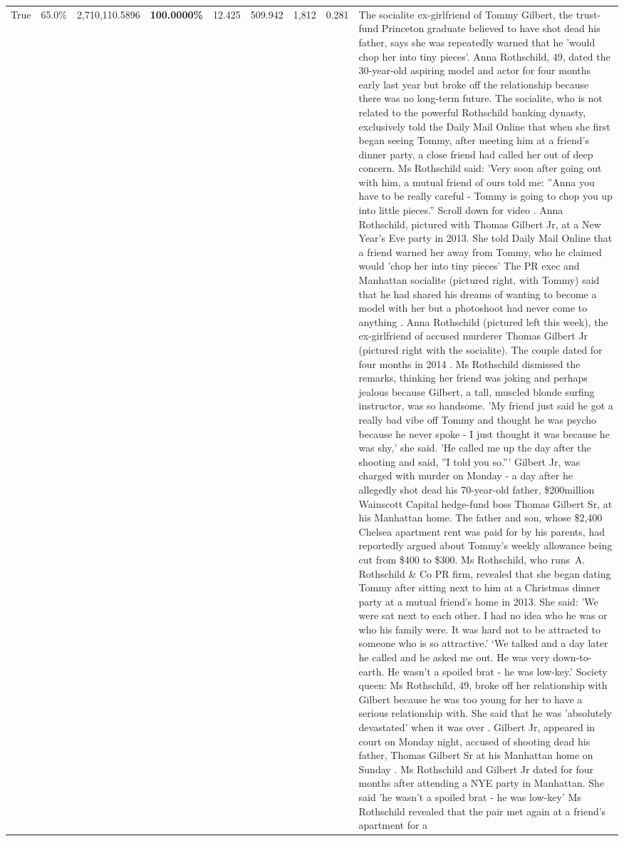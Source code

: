 \begin{table}[H]
\begin{tabular}{lllrlllll}
True & 65.0\% & 2,710,110.5896 & \bfseries \color{red} 100.0000\% & 12.425 & 509.942 & 1,812 & 0.281 & The socialite ex-girlfriend of Tommy Gilbert, the trust-fund Princeton graduate believed to have shot dead his father, says she was repeatedly warned that he 'would chop her into tiny pieces'. Anna Rothschild, 49, dated the 30-year-old aspiring model and actor for four months early last year but broke off the relationship because there was no long-term future. The socialite, who is not related to the powerful Rothschild banking dynasty, exclusively told the Daily Mail Online that when she first began seeing Tommy, after meeting him at a friend's dinner party, a close friend had called her out of deep concern. Ms Rothschild said: 'Very soon after going out with him, a mutual friend of ours told me: ''Anna you have to be really careful - Tommy is going to chop you up into little pieces.'' Scroll down for video . Anna Rothschild, pictured with Thomas Gilbert Jr, at a New Year's Eve party in 2013. She told Daily Mail Online that a friend warned her away from Tommy, who he claimed would 'chop her into tiny pieces' The PR exec and Manhattan socialite (pictured right, with Tommy) said that he had shared his dreams of wanting to become a model with her but a photoshoot had never come to anything . Anna Rothschild (pictured left this week), the ex-girlfriend of accused murderer Thomas Gilbert Jr (pictured right with the socialite). The couple dated for four months in 2014 . Ms Rothschild dismissed the remarks, thinking her friend was joking and perhaps jealous because Gilbert, a tall, muscled blonde surfing instructor, was so handsome. 'My friend just said he got a really bad vibe off Tommy and thought he was psycho because he never spoke - I just thought it was because he was shy,' she said. 'He called me up the day after the shooting and said, ''I told you so.''' Gilbert Jr, was charged with murder on Monday - a day after he allegedly shot dead his 70-year-old father, \$200million Wainscott Capital hedge-fund boss Thomas Gilbert Sr, at his Manhattan home. The father and son, whose \$2,400 Chelsea apartment rent was paid for by his parents, had reportedly argued about Tommy's weekly allowance being cut from \$400 to \$300. Ms Rothschild, who runs A. Rothschild \& Co PR firm, revealed that she began dating Tommy after sitting next to him at a Christmas dinner party at a mutual friend's home in 2013. She said: 'We were sat next to each other. I had no idea who he was or who his family were. It was hard not to be attracted to someone who is so attractive.' ‘We talked and a day later he called and he asked me out. He was very down-to-earth. He wasn’t a spoiled brat - he was low-key.’ Society queen: Ms Rothschild, 49, broke off her relationship with Gilbert because he was too young for her to have a serious relationship with. She said that he was 'absolutely devastated' when it was over . Gilbert Jr, appeared in court on Monday night, accused of shooting dead his father, Thomas Gilbert Sr at his Manhattan home on Sunday . Ms Rothschild and Gilbert Jr dated for four months after attending a NYE party in Manhattan. She said 'he wasn't a spoiled brat - he was low-key' Ms Rothschild revealed that the pair met again at a friend’s apartment for a 
\end{tabular}
\end{table}
